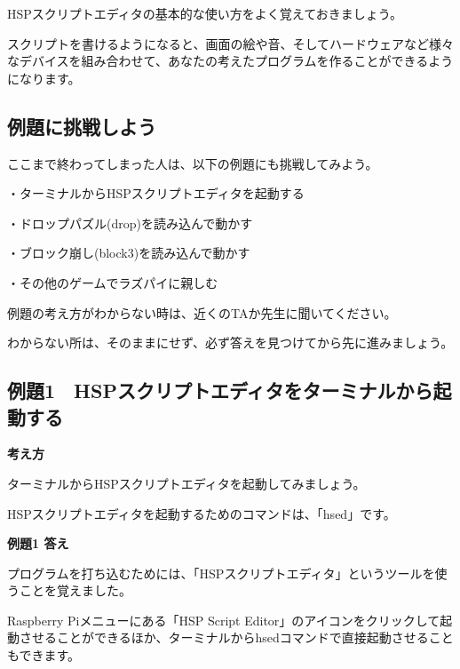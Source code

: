 \documentclass[a4paper,12pt]{jarticle}
\begin{document}
\bigskip
\bigskip
\bigskip

HSPスクリプトエディタの基本的な使い方をよく覚えておきましょう。

スクリプトを書けるようになると、画面の絵や音、そしてハードウェアなど様々なデバイスを組み合わせて、あなたの考えたプログラムを作ることができるようになります。

\bigskip

\subsection{例題に挑戦しよう}

\bigskip
\bigskip

ここまで終わってしまった人は、以下の例題にも挑戦してみよう。


\bigskip

・ターミナルからHSPスクリプトエディタを起動する

・ドロップパズル(drop)を読み込んで動かす

・ブロック崩し(block3)を読み込んで動かす

・その他のゲームでラズパイに親しむ


\bigskip

例題の考え方がわからない時は、近くのTAか先生に聞いてください。

わからない所は、そのままにせず、必ず答えを見つけてから先に進みましょう。

\bigskip


\clearpage
\subsection{例題1　HSPスクリプトエディタをターミナルから起動する}
\bigskip
\bigskip

{\bfseries
考え方}


\bigskip

ターミナルからHSPスクリプトエディタを起動してみましょう。

HSPスクリプトエディタを起動するためのコマンドは、「hsed」です。

\bigskip

{\bfseries
例題1 答え}


\bigskip

プログラムを打ち込むためには、「HSPスクリプトエディタ」というツールを使うことを覚えました。

Raspberry Piメニューにある「HSP Script
Editor」のアイコンをクリックして起動させることができるほか、ターミナルからhsedコマンドで直接起動させることもできます。
\end{document}

